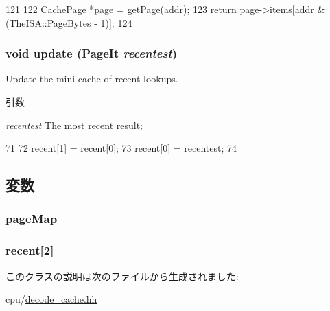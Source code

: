 \begin{DoxyCode}
121     {
122         CachePage *page = getPage(addr);
123         return page->items[addr & (TheISA::PageBytes - 1)];
124     }
\end{DoxyCode}
\hypertarget{classDecodeCache_1_1AddrMap_a64083eea3dfcfac02ed16f18d154f852}{
\subsubsection[{update}]{\setlength{\rightskip}{0pt plus 5cm}void update ({\bf PageIt} {\em recentest})}}
\label{classDecodeCache_1_1AddrMap_a64083eea3dfcfac02ed16f18d154f852}
Update the mini cache of recent lookups. 
\begin{DoxyParams}{引数}
\item[{\em recentest}]The most recent result; \end{DoxyParams}



\begin{DoxyCode}
71     {
72         recent[1] = recent[0];
73         recent[0] = recentest;
74     }
\end{DoxyCode}


\subsection{変数}
\hypertarget{classDecodeCache_1_1AddrMap_a4bcb45c0276447d77068a80d6def657d}{
\subsubsection[{pageMap}]{ {\bf pageMap}}}
\label{classDecodeCache_1_1AddrMap_a4bcb45c0276447d77068a80d6def657d}
\hypertarget{classDecodeCache_1_1AddrMap_ad803f96f3c59c58b1bcf96eb322bec9e}{
\subsubsection[{recent}]{ {\bf recent}\mbox{[}2\mbox{]}}}
\label{classDecodeCache_1_1AddrMap_ad803f96f3c59c58b1bcf96eb322bec9e}


このクラスの説明は次のファイルから生成されました:\begin{DoxyCompactItemize}
\item 
cpu/\hyperlink{cpu_2decode__cache_8hh}{decode\_\-cache.hh}\end{DoxyCompactItemize}
